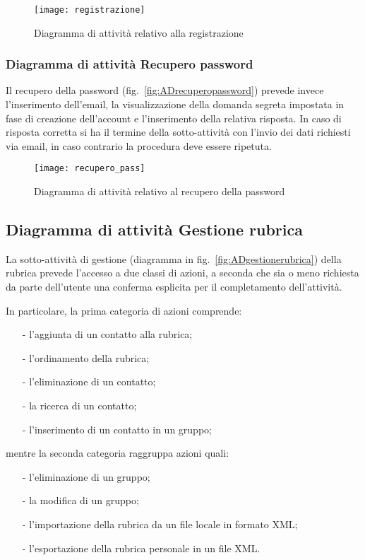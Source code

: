 \begin{figure}[H]
\centering
\texttt{[image: registrazione]}
\caption{Diagramma di attività relativo alla registrazione}\label{fig:ADregistrazione}
\end{figure}

\subsubsection{Diagramma di attività Recupero password}
Il recupero della password (fig.~\vref{fig:ADrecuperopassword}) prevede invece l'inserimento dell'email, la visualizzazione della domanda segreta impostata in fase di creazione dell'account e l'inserimento della relativa risposta. In caso di risposta corretta si ha il termine della sotto-attività con l'invio dei dati richiesti via email, in caso contrario la procedura deve essere ripetuta.

\begin{figure}[H]
\centering
\texttt{[image: recupero\_pass]}
\caption{Diagramma di attività relativo al recupero della password}\label{fig:ADrecuperopassword}
\end{figure}

\subsection{Diagramma di attività Gestione rubrica}
La sotto-attività di gestione (diagramma in fig.~\vref{fig:ADgestionerubrica}) della rubrica prevede l'accesso a due classi di azioni, a seconda che sia o meno richiesta da parte dell'utente una conferma esplicita per il completamento dell'attività.

In particolare, la prima categoria di azioni comprende:
\begin{itemize}[noitemsep,nolistsep]
  \item[-] l'aggiunta di un contatto alla rubrica;
  \item[-] l'ordinamento della rubrica;
  \item[-] l'eliminazione di un contatto;
  \item[-] la ricerca di un contatto;
  \item[-] l'inserimento di un contatto in un gruppo;
\end{itemize}
mentre la seconda categoria raggruppa azioni quali:
\begin{itemize}[noitemsep,nolistsep]
  \item[-] l'eliminazione di un gruppo;
  \item[-] la modifica di un gruppo;
  \item[-] l'importazione della rubrica da un file locale in formato XML;
  \item[-] l'esportazione della rubrica personale in un file XML.
\end{itemize}


